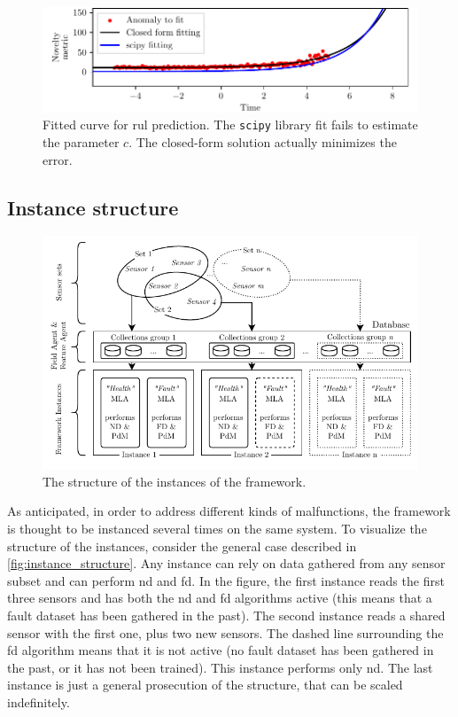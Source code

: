 \begin{figure}
    \centering
    \includegraphics[width=\textwidth]{images/Framework/EXP_3.pdf}
    \caption{Fitted curve for \gls{rul} prediction. The \texttt{scipy} library fit fails to estimate the parameter $c$. The closed-form solution actually minimizes the error.}
    \label{fig:exp_degradation_3}
\end{figure}

\subsection{Instance structure}

\begin{figure}
    \centering
    \includegraphics[scale=1]{images/Framework/FrameworkInstances.pdf}
    \caption{The structure of the instances of the framework.}
    \label{fig:instance_structure}
\end{figure}

As anticipated, in order to address different kinds of malfunctions, the framework is thought to be instanced several times on the same system. To visualize the structure of the instances, consider the general case described in \autoref{fig:instance_structure}. Any instance can rely on data gathered from any sensor subset and can perform \gls{nd} and \gls{fd}. In the figure, the first instance reads the first three sensors and has both the \gls{nd} and \gls{fd} algorithms active (this means that a fault dataset has been gathered in the past). The second instance reads a shared sensor with the first one, plus two new sensors. The dashed line surrounding the \gls{fd} algorithm means that it is not active (no fault dataset has been gathered in the past, or it has not been trained). This instance performs only \gls{nd}. The last instance is just a general prosecution of the structure, that can be scaled indefinitely.
